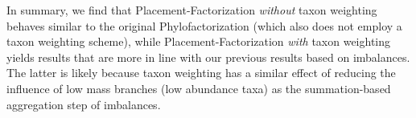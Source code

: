 


In summary, we find that Placement-Factorization \emph{without} taxon weighting
behaves similar to the original Phylofactorization (which also does not employ a taxon weighting scheme),
while Placement-Factorization \emph{with} taxon weighting
yields results that are more in line with our previous results based on imbalances.
The latter is likely because taxon weighting has a similar effect of reducing the influence of low mass branches
(low abundance taxa) as the summation-based aggregation step of imbalances.





